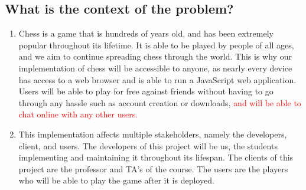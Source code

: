 \documentclass{article}
\begin{document}
\subsection{What is the context of the problem?}
\begin{enumerate}[label={}]
    \item Chess is a game that is hundreds of years old, and has been extremely popular throughout its lifetime. It is able to be played by people of all ages, and we aim to continue spreading chess through the world. This is why our implementation of chess will be accessible to anyone, as nearly every device has access to a web browser and is able to run a JavaScript web application. Users will be able to play for free against friends without having to go through any hassle such as account creation or downloads, \textcolor{red}{and will be able to chat online with any other users.}
    
    \item This implementation affects multiple stakeholders, namely the developers, client, and users. The developers of this project will be us, the students implementing and maintaining it throughout its lifespan. The clients of this project are the professor and TA's of the course. The users are the players who will be able to play the game after it is deployed.
\end{enumerate}
\end{document}
